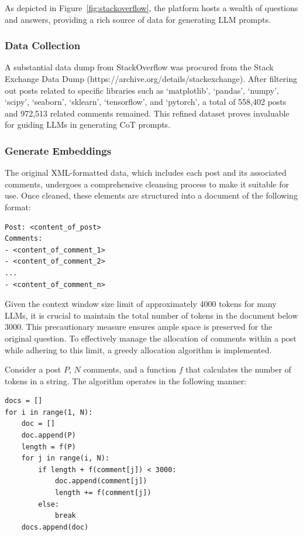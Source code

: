 \documentclass[a4paper,oneside]{book}
\begin{document}
As depicted in Figure~\ref{fig:stackoverflow}, the platform hosts a wealth of questions and answers, providing a rich source of data for generating LLM prompts.

\subsubsection{Data Collection}
A substantial data dump from StackOverflow was procured from the Stack Exchange Data Dump (https://archive.org/details/stackexchange). After filtering out posts related to specific libraries such as `matplotlib', `pandas', `numpy', `scipy', `seaborn', `sklearn', `tensorflow', and `pytorch', a total of 558,402 posts and 972,513 related comments remained. This refined dataset proves invaluable for guiding LLMs in generating CoT prompts.

\subsubsection{Generate Embeddings}
The original XML-formatted data, which includes each post and its associated comments, undergoes a comprehensive cleansing process to make it suitable for use. Once cleaned, these elements are structured into a document of the following format:

\begin{lstlisting}
Post: <content_of_post>
Comments:
- <content_of_comment_1>
- <content_of_comment_2>
...
- <content_of_comment_n>
\end{lstlisting}

Given the context window size limit of approximately 4000 tokens for many LLMs, it is crucial to maintain the total number of tokens in the document below 3000. This precautionary measure ensures ample space is preserved for the original question. To effectively manage the allocation of comments within a post while adhering to this limit, a greedy allocation algorithm is implemented.

Consider a post $P$, $N$ comments, and a function $f$ that calculates the number of tokens in a string. The algorithm operates in the following manner:

\begin{lstlisting}
docs = []
for i in range(1, N):
    doc = []
    doc.append(P)
    length = f(P)
    for j in range(i, N):
        if length + f(comment[j]) < 3000:
            doc.append(comment[j])
            length += f(comment[j])
        else:
            break
    docs.append(doc)
\end{lstlisting}
\end{document}
